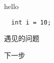\documentclass[presentation]{beamer}
\begin{document}
\begin{frame}[fragile]
  \begin{block}{hello}
\begin{verbatim}
  int i = 10;
\end{verbatim}
\end{block}
\end{frame}


\begin{frame}[label=sec-7]{遇见的问题}
\end{frame}
\begin{frame}[label=sec-8]{下一步}
\end{frame}
\end{document}
